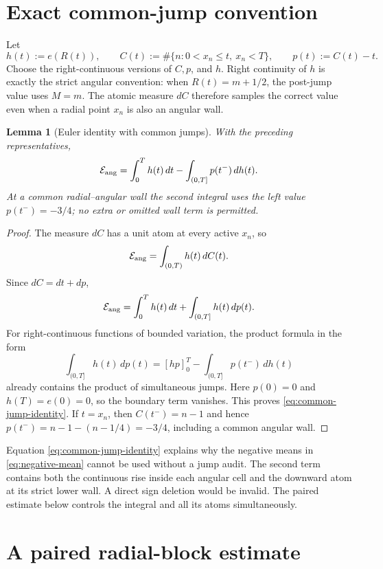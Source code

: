 \documentclass[11pt]{article}
\newtheorem{lemma}{Lemma}
\theoremstyle{remark}
\begin{document}
\section{Exact common-jump convention}

Let
\begin{equation}
 h(t):=e(R(t)),
 \qquad
 C(t):=\#\{n:0<x_n\leq t,\ x_n<T\},
 \qquad
 p(t):=C(t)-t.
 \label{eq:Euler-data}
\end{equation}
Choose the right-continuous versions of $C,p$, and $h$.  Right continuity
of $h$ is exactly the strict angular convention: when $R(t)=m+1/2$,
the post-jump value uses $M=m$.  The atomic measure $dC$ therefore samples
the correct value even when a radial point $x_n$ is also an angular wall.

\begin{lemma}[Euler identity with common jumps]
\label{lem:common-jump}
With the preceding representatives,
\begin{equation}
 \mathcal E_{\rm ang}
 =\int_0^T h(t)\,dt
  -\int_{(0,T]}p(t^- )\,dh(t).
 \label{eq:common-jump-identity}
\end{equation}
At a common radial--angular wall the second integral uses the left value
$p(t^- )=-3/4$; no extra or omitted wall term is permitted.
\end{lemma}

\begin{proof}
The measure $dC$ has a unit atom at every active $x_n$, so
\[
 \mathcal E_{\rm ang}=\int_{(0,T)}h(t)\,dC(t).
\]
Since $dC=dt+dp$,
\[
 \mathcal E_{\rm ang}=\int_0^T h(t)\,dt+\int_{(0,T]}h(t)\,dp(t).
\]
For right-continuous functions of bounded variation, the product formula
in the form
\[
 \int_{(0,T]}h(t)\,dp(t)
 =[hp]_0^T-\int_{(0,T]}p(t^- )\,dh(t)
\]
already contains the product of simultaneous jumps.  Here $p(0)=0$ and
$h(T)=e(0)=0$, so the boundary term vanishes.  This proves
\eqref{eq:common-jump-identity}.  If $t=x_n$, then
$C(t^-)=n-1$ and hence $p(t^-)=n-1-(n-1/4)=-3/4$, including a common
angular wall.
\end{proof}

Equation \eqref{eq:common-jump-identity} explains why the negative means
in \eqref{eq:negative-mean} cannot be used without a jump audit.  The
second term contains both the continuous rise inside each angular cell and
the downward atom at its strict lower wall.  A direct sign deletion would
be invalid.  The paired estimate below controls the integral and all its
atoms simultaneously.

\section{A paired radial-block estimate}
\end{document}
